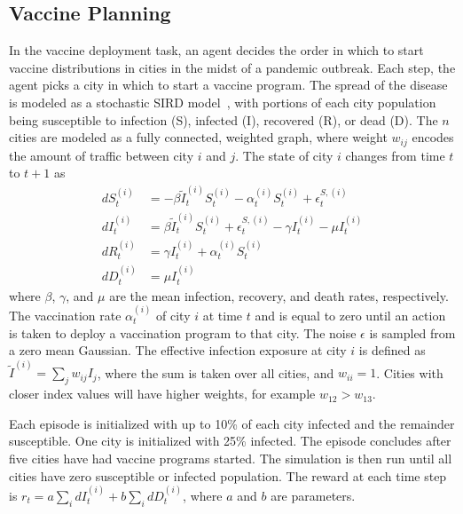 \documentclass[letterpaper]{article} %
\begin{document}
\subsection{Vaccine Planning}
In the vaccine deployment task, an agent decides the order in which to start vaccine distributions in cities in the midst of a pandemic outbreak.
Each step, the agent picks a city in which to start a vaccine program.
The spread of the disease is modeled as a stochastic SIRD model~\cite{bailey1975}, with portions of each city population being susceptible to infection (S), infected (I), recovered (R), or dead (D).
The $n$ cities are modeled as a fully connected, weighted graph, where weight $w_{ij}$ encodes the amount of traffic between city $i$ and $j$.
The state of city $i$ changes from time $t$ to $t+1$ as
\begin{align}
    dS^{(i)}_{t} &= -\beta \tilde{I}^{(i)}_t S^{(i)}_t - \alpha^{(i)}_t S^{(i)}_t +\epsilon^{S, (i)}_t \\
    dI^{(i)}_{t} &= \beta \tilde{I}^{(i)}_t S^{(i)}_t +\epsilon^{S, (i)}_t - \gamma I^{(i)}_t - \mu I^{(i)}_t \\
    dR^{(i)}_{t} &= \gamma I^{(i)}_t + \alpha^{(i)}_t S^{(i)}_t \\
    dD^{(i)}_{t} &= \mu I^{(i)}_t
\end{align}
where $\beta$, $\gamma$, and $\mu$ are the mean infection, recovery, and death rates, respectively.
The vaccination rate $\alpha^{(i)}_{t}$ of city $i$ at time $t$ and is equal to zero until an action is taken to deploy a vaccination program to that city.
The noise $\epsilon$ is sampled from a zero mean Gaussian.
The effective infection exposure at city $i$ is defined as $\tilde{I}^{(i)} = \sum_j w_{ij}I_j$, where the sum is taken over all cities, and $w_{ii} = 1$.
Cities with closer index values will have higher weights, for example $w_{12} > w_{13}$.

Each episode is initialized with up to 10\% of each city infected and the remainder susceptible.
One city is initialized with 25\% infected.
The episode concludes after five cities have had vaccine programs started.
The simulation is then run until all cities have zero susceptible or infected population.
The reward at each time step is $ r_t = a \sum_i dI^{(i)}_t + b \sum_i dD^{(i)}_t $, where $a$ and $b$ are parameters.
\end{document}
